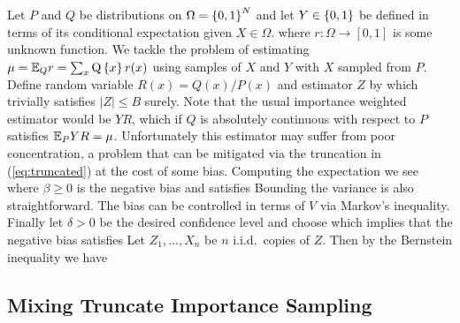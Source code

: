 Let $P$ and $Q$ be distributions on $\Omega = \left\{0,1\right\}^N$ and let $Y \in \left\{0,1\right\}$ be defined in terms of its conditional expectation given $X \in \Omega$.
where $r:\Omega \to [0,1]$ is some unknown function.
We tackle the problem of estimating $\mu = \mathbb E_Q r = \sum_x \operatorname{Q}\left\{x\right\} r(x)$ using
samples of $X$ and $Y$ with $X$ sampled from $P$.
Define random variable $R(x) = Q(x)/P(x)$ and estimator $Z$ by
which trivially satisfies $|Z| \leq B$ surely.
Note that the usual importance weighted estimator would be $YR$, which if $Q$ is absolutely continuous with respect to $P$ satisfies $\mathbb E_P YR = \mu$. Unfortunately
this estimator may suffer from poor concentration, a problem that can be mitigated via the truncation in (\ref{eq:truncated}) at the cost of some bias.
Computing the expectation we see
where $\beta \geq 0$ is the negative bias and satisfies
Bounding the variance is also straightforward.
The bias can be controlled in terms of $V$ via Markov's inequality.
Finally let $\delta > 0$ be the desired confidence level and choose 
which implies that the negative bias satisfies
Let $Z_1,\ldots,X_n$ be $n$ i.i.d.\ copies of $Z$. Then by the Bernstein inequality we have

\subsection*{Mixing Truncate Importance Sampling}

